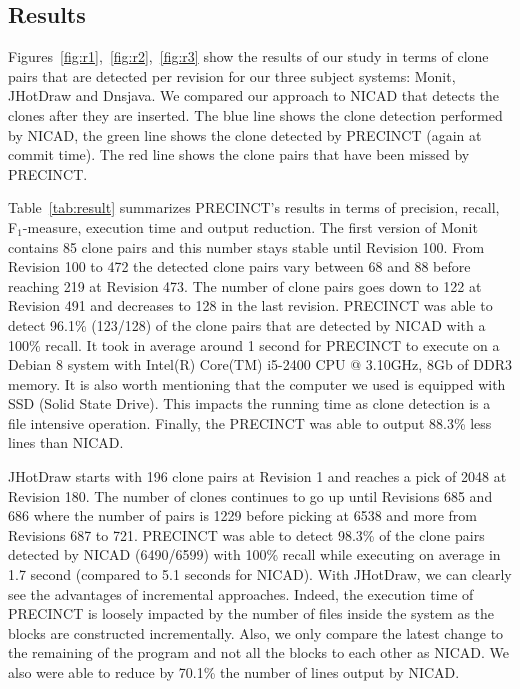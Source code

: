 \documentclass[conference]{IEEEtran}
\begin{document}


\subsection{Results}
\label{sub:Results}

Figures~\ref{fig:r1},~\ref{fig:r2},~\ref{fig:r3} show the results of our study in terms of clone pairs that are detected per revision for our three subject systems: Monit, JHotDraw and Dnsjava. We compared our approach to NICAD that detects the clones after they are inserted. The blue line shows the clone detection performed by NICAD, the green line shows the clone detected by PRECINCT (again at commit time). The red line shows the clone pairs that have been missed by PRECINCT.



Table~\ref{tab:result} summarizes PRECINCT's results in terms of precision, recall, F$_{1}$-measure, execution time and output reduction.
The first version of Monit contains 85 clone pairs and this number stays stable until Revision 100. From Revision 100 to 472 the detected clone pairs vary between 68 and 88 before reaching 219 at Revision 473.
The number of clone pairs goes down to 122 at Revision 491 and decreases to 128 in the last revision. PRECINCT was able to detect 96.1\% (123/128) of the clone pairs that are detected by NICAD with a 100\% recall.
It took in average around 1 second for PRECINCT to execute on a Debian 8 system with Intel(R) Core(TM) i5-2400 CPU @ 3.10GHz, 8Gb of DDR3 memory.
It is also worth mentioning that the computer we used is equipped with SSD (Solid State Drive).
This impacts the running time as clone detection is a file intensive operation.
Finally, the PRECINCT was able to output 88.3\% less lines than NICAD.

JHotDraw starts with 196 clone pairs at Revision 1 and reaches a pick of 2048 at Revision 180. The number of clones  continues to go up until Revisions 685 and 686 where the number of pairs is 1229 before picking at 6538 and more from Revisions 687 to 721.
PRECINCT was able to detect 98.3\% of the clone pairs detected by NICAD (6490/6599) with 100\% recall while executing on average in 1.7 second (compared to 5.1 seconds for NICAD).
With JHotDraw, we can clearly see the advantages of incremental approaches.
Indeed, the execution time of PRECINCT is loosely impacted by the number of files inside the system as the blocks are constructed incrementally.
Also, we only compare the latest change to the remaining of the program and not all the blocks to each other as NICAD.
We also were able to reduce by 70.1\% the number of lines output by NICAD.
\end{document}
